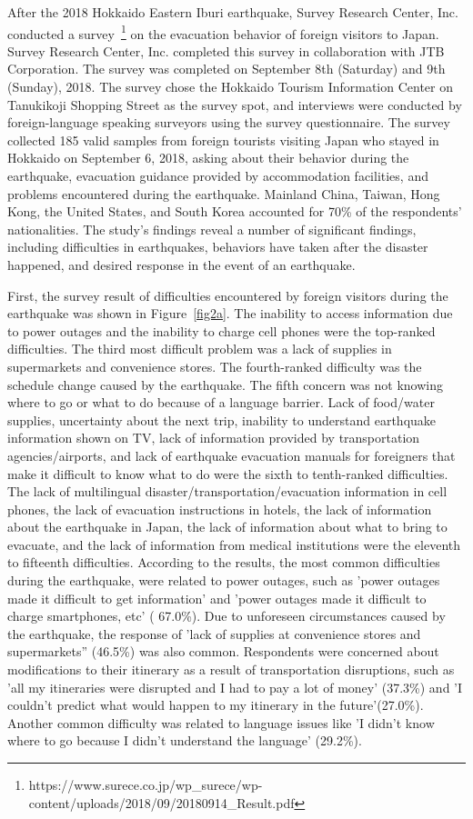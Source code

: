 After the 2018 Hokkaido Eastern Iburi earthquake, Survey Research Center, Inc. conducted a survey~\footnote{https://www.surece.co.jp/wp\_surece/wp-content/uploads/2018/09/20180914\_Result.pdf} on the evacuation behavior of foreign visitors to Japan. Survey Research Center, Inc. completed this survey in collaboration with JTB Corporation. The survey was completed on September 8th (Saturday) and 9th (Sunday), 2018. The survey chose the Hokkaido Tourism Information Center on Tanukikoji Shopping Street as the survey spot, and interviews were conducted by foreign-language speaking surveyors using the survey questionnaire. The survey collected 185 valid samples from foreign tourists visiting Japan who stayed in Hokkaido on September 6, 2018, asking about their behavior during the earthquake, evacuation guidance provided by accommodation facilities, and problems encountered during the earthquake. Mainland China, Taiwan, Hong Kong, the United States, and South Korea accounted for 70\% of the respondents' nationalities. The study's findings reveal a number of significant findings, including difficulties in earthquakes, behaviors have taken after the disaster happened, and desired response in the event of an earthquake.

First, the survey result of difficulties encountered by foreign visitors during the earthquake was shown in Figure~\ref{fig2a}. The inability to access information due to power outages and the inability to charge cell phones were the top-ranked difficulties. The third most difficult problem was a lack of supplies in supermarkets and convenience stores. The fourth-ranked difficulty was the schedule change caused by the earthquake. The fifth concern was not knowing where to go or what to do because of a language barrier. Lack of food/water supplies, uncertainty about the next trip, inability to understand earthquake information shown on TV, lack of information provided by transportation agencies/airports, and lack of earthquake evacuation manuals for foreigners that make it difficult to know what to do were the sixth to tenth-ranked difficulties. The lack of multilingual disaster/transportation/evacuation information in cell phones, the lack of evacuation instructions in hotels, the lack of information about the earthquake in Japan, the lack of information about what to bring to evacuate, and the lack of information from medical institutions were the eleventh to fifteenth difficulties. According to the results, the most common difficulties during the earthquake, were related to power outages, such as 'power outages made it difficult to get information' and 'power outages made it difficult to charge smartphones, etc' ( 67.0\%). Due to unforeseen circumstances caused by the earthquake, the response of 'lack of supplies at convenience stores and supermarkets”  (46.5\%) was also common. Respondents were concerned about modifications to their itinerary as a result of transportation disruptions, such as 'all my itineraries were disrupted and I had to pay a lot of money' (37.3\%) and 'I couldn't predict what would happen to my itinerary in the future'(27.0\%). Another common difficulty was related to language issues like 'I didn't know where to go because I didn't understand the language' (29.2\%).

